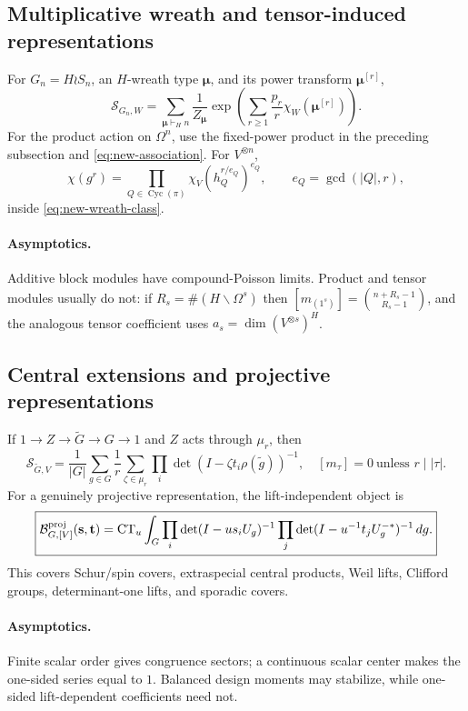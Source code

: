 \documentclass[10pt]{article}
\newcommand{\MGF}{\mathcal S}
\newcommand{\Cyc}{\operatorname{Cyc}}
\newcommand{\CTu}{\operatorname{CT}_u}
\begin{document}
\subsection{Multiplicative wreath and tensor-induced representations}
For $G_n=H\wr S_n$, an $H$-wreath type $\boldsymbol\mu$, and its power
transform $\boldsymbol\mu^{[r]}$,
\begin{equation}\label{eq:new-wreath-class}
 \boxed{\MGF_{G_n,W}=\sum_{\boldsymbol\mu\vdash_Hn}
 \frac1{Z_{\boldsymbol\mu}}
 \exp\!\left(\sum_{r\ge1}\frac{p_r}{r}
 \chi_W(\boldsymbol\mu^{[r]})\right).}
\end{equation}
For the product action on $\Omega^n$, use the fixed-power product in the
preceding subsection and \eqref{eq:new-association}.  For $V^{\otimes n}$,
\[
 \chi(g^r)=\prod_{Q\in\Cyc(\pi)}
 \chi_V(h_Q^{r/e_Q})^{e_Q},\qquad e_Q=\gcd(|Q|,r),
\]
inside \eqref{eq:new-wreath-class}.
\paragraph{Asymptotics.}
Additive block modules have compound-Poisson limits.  Product and tensor
modules usually do not: if $R_s=\#(H\backslash\Omega^s)$ then
$[m_{(1^s)}]=\binom{n+R_s-1}{R_s-1}$, and the analogous tensor coefficient
uses $a_s=\dim(V^{\otimes s})^H$.

\subsection{Central extensions and projective representations}
If $1\to Z\to\widetilde G\to G\to1$ and $Z$ acts through $\mu_r$, then
\begin{equation}\label{eq:new-central}
 \boxed{\MGF_{\widetilde G,V}=\frac1{|G|}\sum_{g\in G}\frac1r
 \sum_{\zeta\in\mu_r}\prod_i\det(I-\zeta t_i\rho(\widetilde g))^{-1},
 \quad [m_\tau]=0\ \text{unless }r\mid|\tau|.}
\end{equation}
For a genuinely projective representation, the lift-independent object is
\[
 \boxed{\mathcal B^{\rm proj}_{G,[V]}(\mathbf s,\mathbf t)=
 \CTu\int_G\prod_i\det(I-us_iU_g)^{-1}
 \prod_j\det(I-u^{-1}t_jU_g^{-*})^{-1}\,dg.}
\]
This covers Schur/spin covers, extraspecial central products, Weil lifts,
Clifford groups, determinant-one lifts, and sporadic covers.
\paragraph{Asymptotics.}
Finite scalar order gives congruence sectors; a continuous scalar center makes
the one-sided series equal to $1$.  Balanced design moments may stabilize,
while one-sided lift-dependent coefficients need not.
\end{document}
